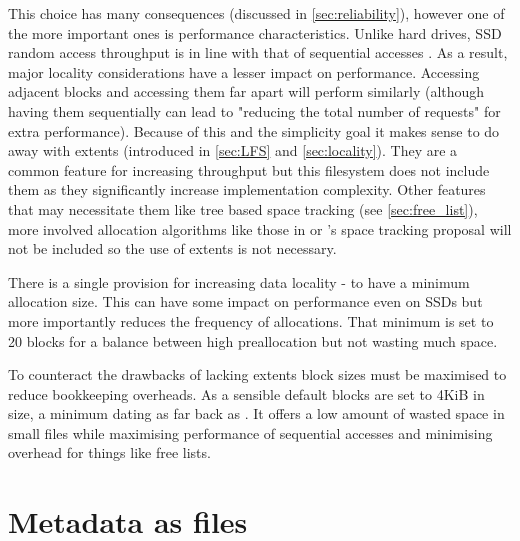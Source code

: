         This choice has many consequences (discussed in \autoref{sec:reliability}),
        however one of the more important ones is performance characteristics.
        Unlike hard drives, SSD random access throughput is in line with that
        of sequential accesses \cite{servethehome_review}. As a result, major
        locality considerations have a lesser impact on performance. Accessing
        adjacent blocks and accessing them far apart will perform similarly
        (although having them sequentially can lead to "reducing the total
        number of requests" \cite{ext4_docs} for extra performance). Because of
        this and the simplicity goal it makes sense to do away with extents
        (introduced in \autoref{sec:LFS} and \autoref{sec:locality}). They are a common
        feature for increasing throughput but this filesystem does not include
        them as they significantly increase implementation complexity. Other
        features that may necessitate them like tree based space tracking (see
        \autoref{sec:free_list}), more involved allocation algorithms like those in
         or 's space tracking
        proposal will not be included so the use of extents is not necessary.

        There is a single provision for increasing data locality - to have a
        minimum allocation size. This can have some impact on performance even
        on SSDs but more importantly reduces the frequency of allocations. That
        minimum is set to 20 blocks for a balance between high preallocation
        but not wasting much space.

        To counteract the drawbacks of lacking extents block sizes must be
        maximised to reduce bookkeeping overheads. As a sensible default blocks
        are set to 4KiB in size, a minimum dating as far back as 
        . It offers a low amount of wasted space in small files
        while maximising performance of sequential accesses and minimising
        overhead for things like free lists.

    \section{Metadata as files}
        \label{sec:files}

